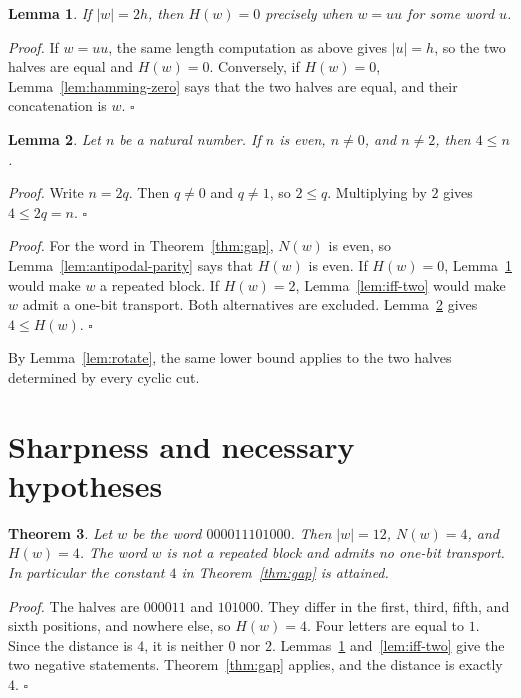 \documentclass[11pt,letterpaper]{article}
\newtheorem{theorem}{Theorem}
\newtheorem{lemma}[theorem]{Lemma}
\newenvironment{proof}{\noindent\textit{Proof.}}{\hfill\(\square\)}
\begin{document}
\begin{lemma}
\label{lem:repetition}
If \(|w|=2h\), then \(H(w)=0\) precisely when \(w=uu\) for some word \(u\).
\end{lemma}

\begin{proof}
If \(w=uu\), the same length computation as above gives \(|u|=h\), so the two halves are equal and \(H(w)=0\). Conversely, if \(H(w)=0\), Lemma~\ref{lem:hamming-zero} says that the two halves are equal, and their concatenation is \(w\).
\end{proof}

\begin{lemma}
\label{lem:even-four}
Let \(n\) be a natural number. If \(n\) is even, \(n\neq 0\), and \(n\neq 2\), then \(4\le n\).
\end{lemma}

\begin{proof}
Write \(n=2q\). Then \(q\neq 0\) and \(q\neq 1\), so \(2\le q\). Multiplying by \(2\) gives \(4\le 2q=n\).
\end{proof}

\begin{proof}
For the word in Theorem~\ref{thm:gap}, \(N(w)\) is even, so Lemma~\ref{lem:antipodal-parity} says that \(H(w)\) is even. If \(H(w)=0\), Lemma~\ref{lem:repetition} would make \(w\) a repeated block. If \(H(w)=2\), Lemma~\ref{lem:iff-two} would make \(w\) admit a one-bit transport. Both alternatives are excluded. Lemma~\ref{lem:even-four} gives \(4\le H(w)\).
\end{proof}

By Lemma~\ref{lem:rotate}, the same lower bound applies to the two halves determined by every cyclic cut.

\section{Sharpness and necessary hypotheses}

\begin{theorem}
\label{thm:sharp}
Let \(w\) be the word \(000011101000\). Then \(|w|=12\), \(N(w)=4\), and \(H(w)=4\). The word \(w\) is not a repeated block and admits no one-bit transport. In particular the constant \(4\) in Theorem~\ref{thm:gap} is attained.
\end{theorem}

\begin{proof}
The halves are \(000011\) and \(101000\). They differ in the first, third, fifth, and sixth positions, and nowhere else, so \(H(w)=4\). Four letters are equal to \(1\). Since the distance is \(4\), it is neither \(0\) nor \(2\). Lemmas~\ref{lem:repetition} and~\ref{lem:iff-two} give the two negative statements. Theorem~\ref{thm:gap} applies, and the distance is exactly \(4\).
\end{proof}
\end{document}
